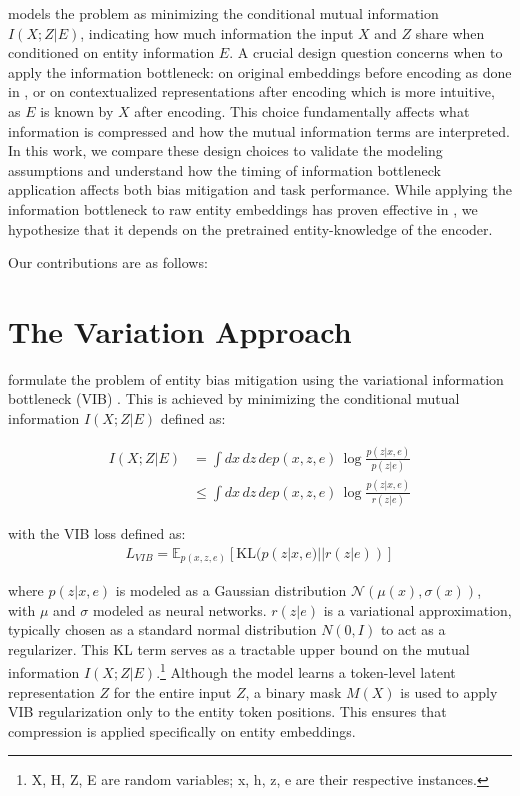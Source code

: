 \documentclass[11pt]{article}
\begin{document}
\cite{} models the problem as minimizing the conditional mutual information $I(X;Z|E)$, indicating how much information the input $X$ and $Z$ share when conditioned on entity information $E$. A crucial design question concerns when to apply the information bottleneck: on original embeddings before encoding as done in \cite{}, or on contextualized representations after encoding which is more intuitive, as $E$ is known by $X$ after encoding. This choice fundamentally affects what information is compressed and how the mutual information terms are interpreted. In this work, we compare these design choices to validate the modeling assumptions and understand how the timing of information bottleneck application affects both bias mitigation and task performance. While applying the information bottleneck to raw entity embeddings has proven effective in \cite{}, we hypothesize that it depends on the pretrained entity-knowledge of the encoder.

Our contributions are as follows:


\section{The Variation Approach}
\cite{} formulate the problem of entity bias mitigation using the variational information bottleneck (VIB) \cite{}. This is achieved by minimizing the conditional mutual information $I(X;Z|E)$ defined as: 

\begin{align*}
    I(X;Z|E) &= \int dx\,dz\, de p(x,z,e)\,\log \frac{p(z|x,e)}{p(z|e)} \\
    &\leq \int dx\,dz\, de p(x,z,e)\,\log \frac{p(z|x,e)}{r(z|e)} 
\end{align*}

\noindent
with the VIB loss defined as: 
\begin{align}
    L_{VIB} = \mathbb{E}_{p(x,z,e)}[\text{KL}(p(z|x,e) || r(z|e) )]
\end{align}

where $p(z|x,e)$ is modeled as a Gaussian distribution $\mathcal{N}(\mu(x), \sigma(x))$, with $\mu$ and $\sigma$ modeled as neural networks. $r(z|e)$ is a variational approximation, typically chosen as a standard normal distribution $N(0, I)$ to act as a regularizer. This KL term serves as a tractable upper bound on the mutual information $I(X;Z|E)$.\footnote{X, H, Z, E are random variables;
x, h, z, e are their respective instances.} Although the model learns a token-level latent representation $Z$ for the entire input 
$Z$, a binary mask $M(X)$ is used to apply VIB regularization only to the entity token positions. This ensures that compression is applied specifically on entity embeddings.
\end{document}
